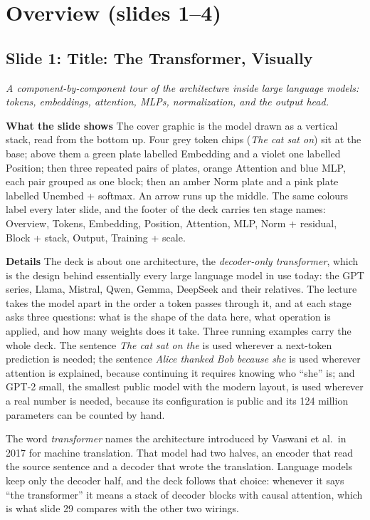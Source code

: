 \documentclass[11pt,letterpaper]{article}
\newcommand{\setstage}[1]{\colorlet{stagec}{#1}}
\newcommand{\slide}[3]{%
  \subsection[Slide #1: #2]{Slide #1: #2}%
  {\color{muted}\itshape #3\par}\medskip}
\newcommand{\para}[1]{\medskip\noindent\textbf{#1}\quad}
\begin{document}
\setstage{ink}
\section{Overview (slides 1--4)}

\slide{1}{Title: The Transformer, Visually}{A component-by-component tour of the architecture inside large language models: tokens, embeddings, attention, MLPs, normalization, and the output head.}

\para{What the slide shows} The cover graphic is the model drawn as a vertical stack, read from the bottom up. Four grey token chips (\emph{The cat sat on}) sit at the base; above them a green plate labelled Embedding and a violet one labelled Position; then three repeated pairs of plates, orange Attention and blue MLP, each pair grouped as one block; then an amber Norm plate and a pink plate labelled Unembed + softmax. An arrow runs up the middle. The same colours label every later slide, and the footer of the deck carries ten stage names: Overview, Tokens, Embedding, Position, Attention, MLP, Norm + residual, Block + stack, Output, Training + scale.

\para{Details} The deck is about one architecture, the \emph{decoder-only transformer}, which is the design behind essentially every large language model in use today: the GPT series, Llama, Mistral, Qwen, Gemma, DeepSeek and their relatives. The lecture takes the model apart in the order a token passes through it, and at each stage asks three questions: what is the shape of the data here, what operation is applied, and how many weights does it take. Three running examples carry the whole deck. The sentence \emph{The cat sat on the} is used wherever a next-token prediction is needed; the sentence \emph{Alice thanked Bob because she} is used wherever attention is explained, because continuing it requires knowing who ``she'' is; and GPT-2 small, the smallest public model with the modern layout, is used wherever a real number is needed, because its configuration is public and its 124 million parameters can be counted by hand.

The word \emph{transformer} names the architecture introduced by Vaswani et al.\ in 2017 for machine translation. That model had two halves, an encoder that read the source sentence and a decoder that wrote the translation. Language models keep only the decoder half, and the deck follows that choice: whenever it says ``the transformer'' it means a stack of decoder blocks with causal attention, which is what slide 29 compares with the other two wirings.
\end{document}
